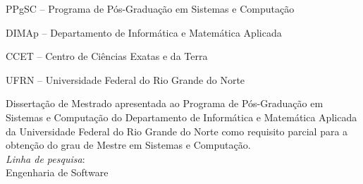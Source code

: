 
\titulo{\Large{\mscThesisTitle}}
\autor{\author}
\orientador[Orientador]{\par \advisor}
\coorientador[Coorientador]{\par \coadvisor}
\instituicao
{
	PPgSC -- Programa de Pós-Graduação em Sistemas e Computação\par 
	DIMAp -- Departamento de Informática e Matemática Aplicada\par
   CCET -- Centro de Ciências Exatas e da Terra\par
   UFRN -- Universidade Federal do Rio Grande do Norte
}
	
\comentario
{
	Dissertação de Mestrado apresentada ao Programa de Pós-Graduação em Sistemas e Computação do Departamento de Informática e Matemática Aplicada da Universidade Federal do Rio Grande do Norte como requisito parcial para a obtenção do grau de Mestre em Sistemas e Computação.\bigskip\\
   \textit{Linha de pesquisa}:\\Engenharia de Software
}
		
\local{\city}
\data{\date}
	
\folhaderosto